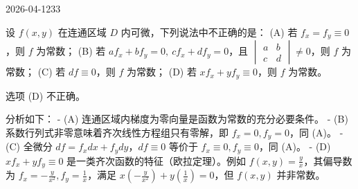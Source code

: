 \begin{mistake}{2026-04-12}{33}

\begin{problemcontent}
设 \( f(x,y) \) 在连通区域 \( D \) 内可微，下列说法中不正确的是：
(A) 若 \( f_x=f_y\equiv0 \)，则 \( f \) 为常数；
(B) 若 \( af_x+bf_y=0,\ cf_x+df_y=0 \)，且 \( \begin{vmatrix} a & b \\ c & d \end{vmatrix}\neq0 \)，则 \( f \) 为常数；
(C) 若 \( df\equiv0 \)，则 \( f \) 为常数；
(D) 若 \( xf_x+yf_y\equiv0 \)，则 \( f \) 为常数。
\end{problemcontent}

\begin{solutioncontent}
选项 (D) 不正确。

分析如下：
- (A) 连通区域内梯度为零向量是函数为常数的充分必要条件。
- (B) 系数行列式非零意味着齐次线性方程组只有零解，即 \( f_x=0, f_y=0 \)，同 (A)。
- (C) 全微分 \( df = f_x dx + f_y dy \)，\( df\equiv 0 \) 等价于 \( f_x \equiv 0, f_y \equiv 0 \)，同 (A)。
- (D) \( xf_x+yf_y\equiv0 \) 是一类齐次函数的特征（欧拉定理）。例如 \( f(x,y) = \frac{y}{x} \)，其偏导数为 \( f_x = -\frac{y}{x^2}, f_y = \frac{1}{x} \)，满足 \( x(-\frac{y}{x^2}) + y(\frac{1}{x}) = 0 \)，但 \( f(x,y) \) 并非常数。
\end{solutioncontent}


\end{mistake}
